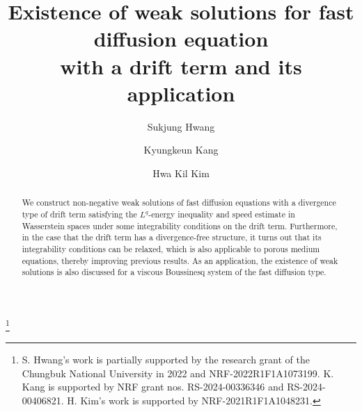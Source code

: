 \documentclass{amsart}
\numberwithin{equation}{section}
\begin{document}
   
\title[Existence of FDE with drifts]{Existence of weak solutions for fast diffusion equation \\
   with a drift term and its application}


\author[S. Hwang]{Sukjung Hwang}
\address{S. Hwang: Department of Mathematics Education, Chungbuk National University, Cheongju 28644, Republic of Korea}

\author[K. Kang]{Kyungkeun Kang}
\address{K. Kang: Department of Mathematics, Yonsei University,  Seoul 03722, Republic of Korea}


\author[H.K. Kim]{Hwa Kil Kim}
\address{H.K. Kim: Department of Mathematics Education, Hannam University, Daejeon 34430, Republic of Korea}


\thanks{
S. Hwang's work is partially supported by the research grant of the Chungbuk National University in 2022 and NRF-2022R1F1A1073199. K. Kang is supported by NRF grant nos. RS-2024-00336346 and RS-2024-00406821. H. Kim's work is supported by NRF-2021R1F1A1048231.}


\date{}


\makeatletter
{}
\makeatother
{}
 



\begin{abstract}
 We construct non-negative weak solutions of fast diffusion equations with a divergence type of drift term satisfying the $L^q$-energy inequality and speed estimate in Wasserstein spaces under some integrability conditions on the drift term. Furthermore, in the case that the drift term has a divergence-free structure, it turns out that its integrability conditions can be relaxed, which is also applicable to porous medium equations, thereby improving previous results. As an application, the existence of weak solutions is also discussed for a viscous Boussinesq system of the fast diffusion type.
\end{abstract}
\end{document}

